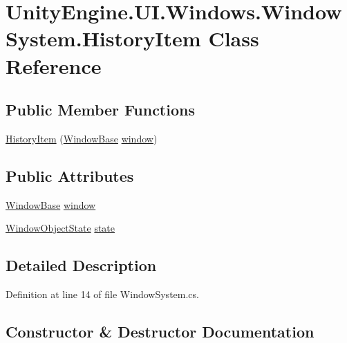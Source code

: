 \hypertarget{class_unity_engine_1_1_u_i_1_1_windows_1_1_window_system_1_1_history_item}{}\section{Unity\+Engine.\+U\+I.\+Windows.\+Window\+System.\+History\+Item Class Reference}
\label{class_unity_engine_1_1_u_i_1_1_windows_1_1_window_system_1_1_history_item}
\subsection*{Public Member Functions}
\begin{DoxyCompactItemize}
\item 
\hyperlink{class_unity_engine_1_1_u_i_1_1_windows_1_1_window_system_1_1_history_item_a71da6a802c8c0d00593185d2f63fefa4}{History\+Item} (\hyperlink{class_unity_engine_1_1_u_i_1_1_windows_1_1_window_base}{Window\+Base} \hyperlink{class_unity_engine_1_1_u_i_1_1_windows_1_1_window_system_1_1_history_item_afe9de6d9b187a0d439adc30724a30769}{window})
\end{DoxyCompactItemize}
\subsection*{Public Attributes}
\begin{DoxyCompactItemize}
\item 
\hyperlink{class_unity_engine_1_1_u_i_1_1_windows_1_1_window_base}{Window\+Base} \hyperlink{class_unity_engine_1_1_u_i_1_1_windows_1_1_window_system_1_1_history_item_afe9de6d9b187a0d439adc30724a30769}{window}
\item 
\hyperlink{namespace_unity_engine_1_1_u_i_1_1_windows_aa2b8efef4db5d0280e4019ea89bb63ec}{Window\+Object\+State} \hyperlink{class_unity_engine_1_1_u_i_1_1_windows_1_1_window_system_1_1_history_item_a4031258e632915760d1f1fabbdc1277f}{state}
\end{DoxyCompactItemize}


\subsection{Detailed Description}


Definition at line 14 of file Window\+System.\+cs.



\subsection{Constructor \& Destructor Documentation}
\hypertarget{class_unity_engine_1_1_u_i_1_1_windows_1_1_window_system_1_1_history_item_a71da6a802c8c0d00593185d2f63fefa4}{}
